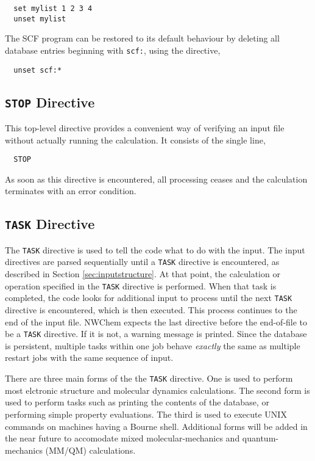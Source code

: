 \begin{verbatim}
  set mylist 1 2 3 4
  unset mylist
\end{verbatim}

The SCF program can be restored to its default behaviour by
deleting all database entries beginning with \verb+scf:+, using the directive,

\begin{verbatim}
  unset scf:*
\end{verbatim}

\subsection{{\tt STOP} Directive}

This top-level directive provides a convenient way of verifying 
an input file without actually running the calculation.  It consists 
of the single line,

\begin{verbatim}
  STOP
\end{verbatim}

As soon as this directive is encountered, all processing ceases and
the calculation terminates with an error condition.

\subsection{{\tt TASK} Directive}
\label{sec:task}

The \verb+TASK+ directive is used to tell the code what to do with the
input.  The input directives are parsed sequentially until a
\verb+TASK+ directive is encountered, as described in Section
\ref{sec:inputstructure}.  At that point, the calculation or operation
specified in the \verb+TASK+ directive is performed.  When that task
is completed, the code looks for additional input to process until the
next \verb+TASK+ directive is encountered, which is then executed.
This process continues to the end of the input file.  NWChem expects
the last directive before the end-of-file to be a \verb+TASK+
directive.  If it is not, a warning message is printed.  Since the
database is persistent, multiple tasks within one job behave {\em
  exactly} the same as multiple restart jobs with the same sequence of
input.

There are three main forms of the the \verb+TASK+ directive.  One is
used to perform most elctronic structure and molecular dynamics
calculations.  The second form is used to perform tasks such as
printing the contents of the database, or performing simple property
evaluations.  The third is used to execute UNIX commands on machines
having a Bourne shell.  Additional forms will be added in the near
future to accomodate mixed molecular-mechanics and quantum-mechanics
(MM/QM) calculations.

